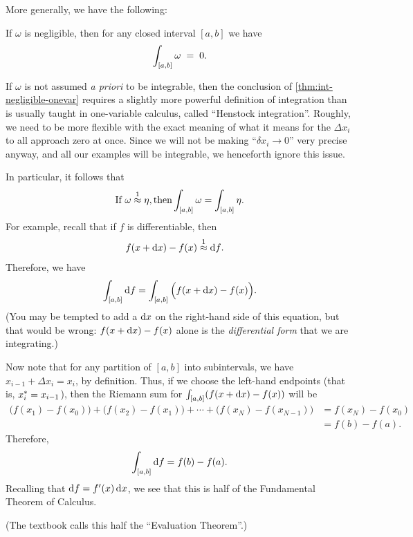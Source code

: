 \documentclass[12pt]{amsart}
\begin{document}
More generally, we have the following:

\begin{thm}\label{thm:int-negligible-onevar}
  If $\omega$ is negligible, then for any closed interval $[a,b]$ we have
  \[ \int_{[a,b]} \omega \;=\; 0.\]
\end{thm}

\begin{adv}
  If $\omega$ is not assumed \emph{a priori} to be integrable, then the conclusion of \cref{thm:int-negligible-onevar} requires a slightly more powerful definition of integration than is usually taught in one-variable calculus, called ``Henstock integration''.
  Roughly, we need to be more flexible with the exact meaning of what it means for the $\Delta x_i$ to all approach zero at once.
  Since we will not be making ``$\delta x_i\to 0$'' very precise anyway, and all our examples will be integrable, we henceforth ignore this issue.
\end{adv}

In particular, it follows that
\begin{equation}\label{eq:int-apx1-equal}
  \text{If }\omega\mathrel{\overset{1}{\approx}} \eta, \text{then} \displaystyle\int_{[a,b]} \omega = \int_{[a,b]} \eta.
\end{equation}
For example, recall that if $f$ is differentiable, then
\begin{align*}
  f(x+\dx)-f(x) &\apx1 \df. %
\end{align*}
Therefore, we have
\[ \int_{[a,b]} {\mathrm{d} f} = \int_{[a,b]} \Big(f(x+{\mathrm{d} x}) - f(x)\Big). \]
(You may be tempted to add a ${\mathrm{d} x}$ on the right-hand side of this equation, but that would be wrong: $f(x+{\mathrm{d} x}) - f(x)$ alone is the \emph{differential form} that we are integrating.)

Now note that for any partition of $[a,b]$ into subintervals, we have $x_{i-1} + \Delta x_i = x_i$, by definition.
Thus, if we choose the left-hand endpoints (that is, ${x}_{i}^* = x_{i-1}$), then the Riemann sum for $\int_{[a,b]} (f(x+{\mathrm{d} x}) - f(x))$ will be
\begin{align*}
  \Big(f(x_1) - f(x_0)\Big) + \Big(f(x_2)-f(x_1)\Big) + \cdots + \Big(f(x_N) - f(x_{N-1})\Big)
  &= f(x_N) - f(x_0)\\
  &= f(b) - f(a).
\end{align*}
Therefore,
\begin{equation}
  \int_{[a,b]} {\mathrm{d} f} = f(b) - f(a).\label{eq:differential-ftc-eval}
\end{equation}
Recalling that ${\mathrm{d} f} = f'(x)\,{\mathrm{d} x}$, we see that this is half of the Fundamental Theorem of Calculus.
\begin{stewart}(The textbook calls this half the ``Evaluation Theorem''.)\end{stewart}
\end{document}
